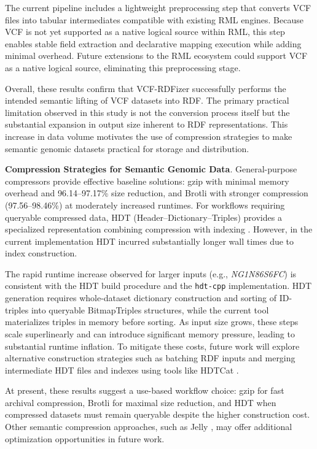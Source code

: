 \documentclass[unnumsec,webpdf,contemporary,large]{oup-authoring-template}
\begin{document}
The current pipeline includes a lightweight preprocessing step that converts VCF files into tabular intermediates compatible with existing RML engines. 
Because VCF is not yet supported as a native logical source within RML, this step enables stable field extraction and declarative mapping execution while adding minimal overhead. 
Future extensions to the RML ecosystem could support VCF as a native logical source, eliminating this preprocessing stage.

Overall, these results confirm that VCF-RDFizer successfully performs the intended semantic lifting of VCF datasets into RDF. 
The primary practical limitation observed in this study is not the conversion process itself but the substantial expansion in output size inherent to RDF representations. 
This increase in data volume motivates the use of compression strategies to make semantic genomic datasets practical for storage and distribution.

\textbf{Compression Strategies for Semantic Genomic Data}.
General-purpose compressors provide effective baseline solutions: gzip with minimal memory overhead and 96.14--97.17\% size reduction, and Brotli with stronger compression (97.56--98.46\%) at moderately increased runtimes. 
For workflows requiring queryable compressed data, HDT (Header–Dictionary–Triples) provides a specialized representation combining compression with indexing \cite{hdt_2013}. 
However, in the current implementation HDT incurred substantially longer wall times due to index construction.

The rapid runtime increase observed for larger inputs (e.g., \textit{NG1N86S6FC}) is consistent with the HDT build procedure and the \texttt{hdt-cpp} implementation. 
HDT generation requires whole-dataset dictionary construction and sorting of ID-triples into queryable BitmapTriples structures, while the current tool materializes triples in memory before sorting. 
As input size grows, these steps scale superlinearly and can introduce significant memory pressure, leading to substantial runtime inflation.
To mitigate these costs, future work will explore alternative construction strategies such as batching RDF inputs and merging intermediate HDT files and indexes using tools like HDTCat \cite{Diefenbach2020HDTCat}.

At present, these results suggest a use-based workflow choice: gzip for fast archival compression, Brotli for maximal size reduction, and HDT when compressed datasets must remain queryable despite the higher construction cost. 
Other semantic compression approaches, such as Jelly \cite{cottas_2025}, may offer additional optimization opportunities in future work.
\end{document}
